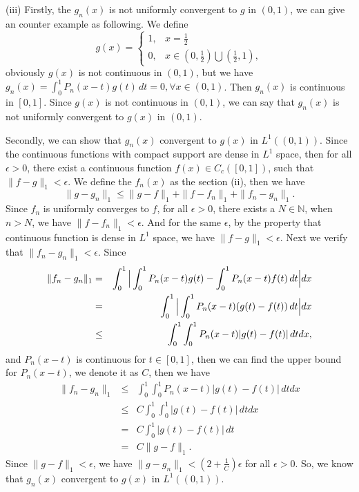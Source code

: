 \documentclass[12pt]{article}
\begin{document}
(iii) Firstly, the $g_{n}(x)$ is not uniformly convergent to $g$ in $(0, 1)$, we can give an counter example as following. We define 
\begin{equation*}
g(x) =
\left\{
             \begin{array}{cl}
             1, & x = \frac{1}{2} \\
             0, & x \in (0, \frac{1}{2}) \bigcup (\frac{1}{2}, 1),
             \end{array}
\right.
\end{equation*}
obviously $g(x)$ is not continuous in $(0, 1)$, but we have $g_{n} (x) = \int_{0}^{1} P_{n}(x -t)g(t) \, d t = 0, \forall x \in (0, 1)$. Then $g_{n} (x)$ is continuous in $[0, 1]$. Since $g(x)$ is not continuous in $(0, 1)$, we can say that $g_{n}(x)$ is not uniformly convergent to $g(x)$ in $(0, 1)$.

Secondly, we can show that $g_{n}(x)$ convergent to $g(x)$ in $L^{1}((0, 1))$. Since the continuous functions with compact support are dense in $L^{1}$ space, then for all $\epsilon > 0$, there exist a continuous function $f(x) \in C_{c}([0, 1])$, such that $\|f- g \|_{1} < \epsilon$. We define the $f_{n}(x)$ as the section (ii), then we have
\begin{equation*}
\|g- g_{n} \|_{1} \leq  \|g- f \|_{1} + \|f- f_{n} \|_{1} + \|f_{n}- g_{n} \|_{1}.
\end{equation*}
Since $f_{n}$ is uniformly converges to $f$, for all $\epsilon > 0$, there exists a $N \in \mathbb{N}$, when $n > N$, we have $\|f- f_{n} \|_{1} < \epsilon$. And for the same $\epsilon$, by the property that continuous function is dense in $L^{1}$ space, we have $\|f- g \|_{1} < \epsilon$. Next we verify that $\|f_{n}- g_{n} \|_{1} < \epsilon$. Since
\begin{eqnarray*}
\|f_{n}- g_{n} \|_{1} &=& \int_{0}^{1} \Big{|} \int_{0}^{1}  P_{n}(x-t) g(t) - \int_{0}^{1}  P_{n}(x-t) f(t) \, d t \Big{|} d x  \\
&=& \int_{0}^{1} \Big{|} \int_{0}^{1}  P_{n}(x-t) (g(t) - f(t)) \, d t \Big{|} d x  \\
&\leq& \int_{0}^{1}  \int_{0}^{1}  P_{n}(x-t) |g(t) - f(t)|\, d t  d x,
\end{eqnarray*}
and $P_{n}(x-t)$ is continuous for $t \in [0, 1]$, then we can find the upper bound for  $P_{n}(x-t)$, we denote it as $C$, then we have
\begin{eqnarray*}
\|f_{n}- g_{n} \|_{1} &\leq&  \int_{0}^{1}  \int_{0}^{1}  P_{n}(x-t) |g(t) - f(t)|\, d t  d x \\
&\leq&  C \int_{0}^{1}  \int_{0}^{1} |g(t) - f(t)|\, d t  d x \\
&=&  C \int_{0}^{1} |g(t) - f(t)|\, d t \\
&=& C \|g-f \|_{1}.
\end{eqnarray*}
Since $\|g-f \|_{1} < \epsilon$, we have $\|g-g_{n} \|_{1} < (2 + \frac{1}{C}) \epsilon$ for all $\epsilon > 0$. So, we know that $g_{n}(x)$ convergent to $g(x)$ in $L^{1}((0, 1))$.
\end{document}
